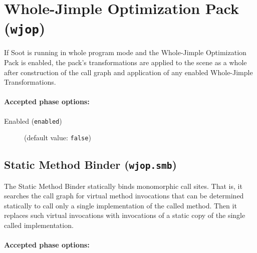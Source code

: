 \documentclass{article}
\begin{document}
\section{Whole-Jimple Optimization Pack ({\tt wjop})}


\par

If Soot is running in whole program mode and the Whole-Jimple
Optimization Pack is enabled, the pack's transformations are
applied to the scene as a whole after construction of the call
graph and application of any enabled Whole-Jimple
Transformations.
                        

\paragraph{Accepted phase options:} 

\begin{description}

\item[Enabled ({\tt enabled})]
(default value: {\tt false})






\end{description}

\subsection{Static Method Binder ({\tt wjop.smb})}

The Static Method Binder statically binds monomorphic call
sites. That is, it searches the call graph for virtual method
invocations that can be determined statically to call only a single
implementation of the called method.  Then it replaces such virtual
invocations with invocations of a static copy of the single called
implementation.


\paragraph{Accepted phase options:} 
\end{document}
